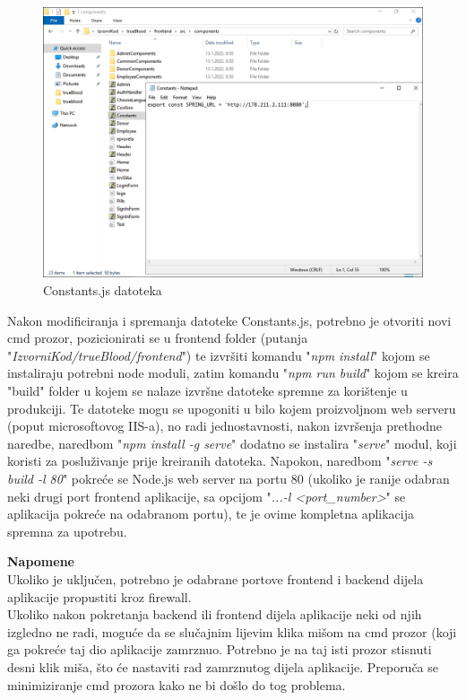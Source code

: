 			\begin{figure}[H]
			\centering
			\includegraphics[width=\textwidth, scale=0.5]{slike/ConstantsJs}
			\caption{Constants.js datoteka}
			\label{fig:ConstantsJs}
			\end{figure}
			
			Nakon modificiranja i spremanja datoteke Constants.js, potrebno je otvoriti novi cmd prozor, pozicionirati se u frontend folder (putanja "\textit{IzvorniKod/trueBlood/frontend}") te izvršiti komandu "\textit{npm install}" kojom se instaliraju potrebni node moduli, zatim komandu "\textit{npm run build}" kojom se kreira "build" folder u kojem se nalaze izvršne datoteke spremne za korištenje u produkciji. Te datoteke mogu se upogoniti u bilo kojem proizvoljnom web serveru (poput microsoftovog IIS-a), no radi jednostavnosti, nakon izvršenja prethodne naredbe, naredbom "\textit{npm install -g serve}" dodatno se instalira "\textit{serve}" modul, koji koristi za posluživanje prije kreiranih datoteka. Napokon, naredbom "\textit{serve -s build -l 80}" pokreće se Node.js web server na portu 80 (ukoliko je ranije odabran neki drugi port frontend aplikacije, sa opcijom "\textit{...-l <port_number>}" se aplikacija pokreće na odabranom portu), te je ovime kompletna aplikacija spremna za upotrebu.
			
			\textbf{Napomene}\\
			
			Ukoliko je uključen, potrebno je odabrane portove frontend i backend dijela aplikacije propustiti kroz firewall.\\
			Ukoliko nakon pokretanja backend ili frontend dijela aplikacije neki od njih izgledno ne radi, moguće da se slučajnim lijevim klika mišom na cmd prozor (koji ga pokreće taj dio aplikacije zamrznuo. Potrebno je na taj isti prozor stisnuti desni klik miša, što će nastaviti rad zamrznutog dijela aplikacije. Preporuča se minimiziranje cmd prozora kako ne bi došlo do tog problema.\\
			
			
			\eject 
